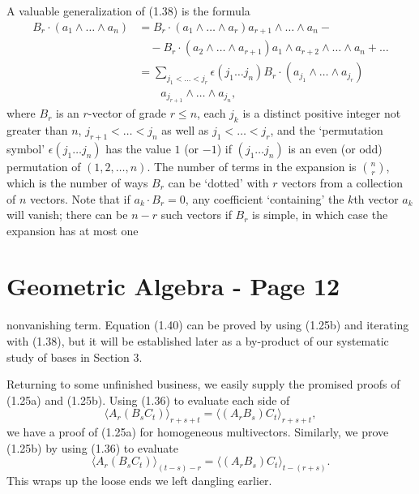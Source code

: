 \documentclass[fleqn]{scrartcl}
\numberwithin{equation}{section}
\begin{document}
\vspace{1em}
\noindent A valuable generalization of (1.38) is the formula
\begin{equation}
\begin{aligned}
B_r \cdot (a_1 \wedge \dots \wedge a_n) &= B_r \cdot (a_1 \wedge \dots \wedge a_r) a_{r+1} \wedge \dots \wedge a_n - \\
&\quad - B_r \cdot (a_2 \wedge \dots \wedge a_{r+1}) a_1 \wedge a_{r+2} \wedge \dots \wedge a_n + \dots \\
&= \sum_{j_1 < \dots < j_r} \epsilon(j_1 \dots j_n) B_r \cdot (a_{j_1} \wedge \dots \wedge a_{j_r}) \\
&\quad\quad a_{j_{r+1}} \wedge \dots \wedge a_{j_n},
\end{aligned}
\tag{1.40}
\end{equation}
where \(B_r\) is an \(r\)-vector of grade \(r \leq n\), each \(j_k\) is a distinct positive integer not greater than \(n\), \(j_{r+1} < \dots < j_n\) as well as \(j_1 < \dots < j_r\), and the `permutation symbol' \(\epsilon(j_1 \dots j_n)\) has the value \(1\) (or \(-1\)) if \((j_1 \dots j_n)\) is an even (or odd) permutation of \((1, 2, \dots, n)\). The number of terms in the expansion is \(\binom{n}{r}\), which is the number of ways \(B_r\) can be `dotted' with \(r\) vectors from a collection of \(n\) vectors. Note that if \(a_k \cdot B_r = 0\), any coefficient `containing' the \(k\)th vector \(a_k\) will vanish; there can be \(n-r\) such vectors if \(B_r\) is simple, in which case the expansion has at most one

\section*{Geometric Algebra - Page 12}

\noindent nonvanishing term. Equation (1.40) can be proved by using (1.25b) and iterating with (1.38), but it will be established later as a by-product of our systematic study of bases in Section 3.

\vspace{1em}
\noindent Returning to some unfinished business, we easily supply the promised proofs of (1.25a) and (1.25b). Using (1.36) to evaluate each side of
\[
\langle A_r (B_s C_t) \rangle_{r+s+t} = \langle (A_r B_s) C_t \rangle_{r+s+t},
\]
we have a proof of (1.25a) for homogeneous multivectors. Similarly, we prove (1.25b) by using (1.36) to evaluate
\[
\langle A_r (B_s C_t) \rangle_{(t-s)-r} = \langle (A_r B_s) C_t \rangle_{t-(r+s)}.
\]
This wraps up the loose ends we left dangling earlier.
\end{document}
